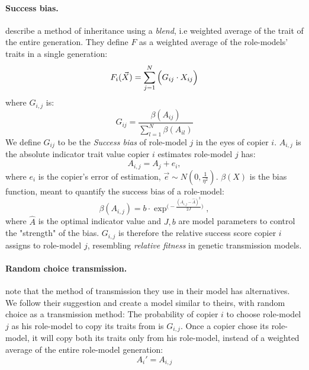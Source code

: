 \documentclass[11pt]{article}
\begin{document}
\paragraph{Success bias.} \citet[Ch.8, p.247-249]{evolutionBook} describe a method of inheritance using a \textit{blend}, i.e weighted average of the trait of the entire generation. They define $F$ as a weighted average  of the role-models' traits in a single generation:
\begin{equation}
F_i(\vec{X}) = \sum_{j=1}^N \Big(G_{ij}\cdot X_{ij}\Big) \\
\end{equation}
where $G_{i,j}$ is: 
\begin{equation}
G_{ij} = \frac{\beta(A_{ij})}{\sum_{l=1}^{N} \beta(A_{il})}
\end{equation}
We define $G_{ij}$ to be the \textit{Success bias} of role-model $j$ in the eyes of copier $i$.
$A_{i,j}$ is the absolute indicator trait value copier $i$ estimates role-model $j$ has:
\begin{equation}\label{eq:relativeIndicator}
A_{i,j} = A_j + e_i,
\end{equation}
where $e_i$ is the copier's error of estimation, $\vec{e} \sim N(0,\frac{1}{\eta^2})$.
$\beta(X)$ is the bias function, meant to quantify the success bias of a role-model:
\begin{equation}\label{eq:success_bias}
\beta(A_{i,j}) = b \cdot \exp^{\Big(-\frac{(A_{i,j} - \hat{A})^2}{2J}\Big)},
\end{equation} 
where $\hat{A}$ is the optimal indicator value and $J,b$ are model parameters to control the "strength" of the bias.
$G_{i,j}$ is therefore the relative success score copier $i$ assigns to role-model $j$, resembling \textit{relative fitness} in genetic transmission models.

\paragraph{Random choice transmission.}
\citet{evolutionBook} note that the method of transmission they use in their model has alternatives. We follow their suggestion and create a model similar to theirs, with random choice as a transmission method: The probability of copier $i$ to choose role-model $j$ as his role-model to copy its traits from is $G_{i,j}$.
Once a copier chose its role-model, it will copy both its traits only from his role-model, instead of a weighted average of the entire role-model generation:
\begin{equation}
A_i' = A_{i,j}
\end{equation}
\end{document}
